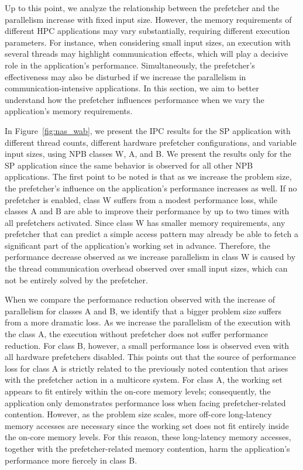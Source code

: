 \documentclass[AMA,final,STIX1COL]{WileyNJD-v2}
\newcommand{\fbm}[1]{\textcolor{red}{\bfseries \ul{fbm: #1} }\vspace{0.2cm}}
\begin{document}
Up to this point, we analyze the relationship between the prefetcher and the parallelism increase with fixed input size.
However, the memory requirements of different HPC applications may vary substantially, requiring different execution parameters. 
For instance, when considering small input sizes, an execution with several threads may highlight communication effects, which will play a decisive role in the application's performance.
Simultaneously, the prefetcher's effectiveness may also be disturbed if we increase the parallelism in communication-intensive applications.
In this section, we aim to better understand how the prefetcher influences performance when we vary the application's memory requirements. %

In Figure~\ref{fig:nas_wab}, we present the IPC results for the SP application with different thread counts, different hardware prefetcher configurations, and variable input sizes, using NPB classes W, A, and B.
We present the results only for the SP application since the same behavior is observed for all other NPB applications.
The first point to be noted is that as we increase the problem size, the prefetcher's influence on the application's performance increases as well. 
If no prefetcher is enabled, class W suffers from a modest performance loss, while classes A and B are able to improve their performance by up to two times with all prefetchers activated.
Since class W has smaller memory requirements, any prefetcher that can predict a simple access pattern may already be able to fetch a significant part of the application's working set in advance.
Therefore, the performance decrease observed as we increase parallelism in class W is caused by the thread communication overhead observed over small input sizes, which can not be entirely solved by the prefetcher.


When we compare the performance reduction observed with the increase of parallelism for classes A and B, we identify that a bigger problem size suffers from a more dramatic loss.
As we increase the parallelism of the execution with the class A, the execution without prefetcher does not suffer performance reduction.
For class B, however, a small performance loss is observed even with all hardware prefetchers disabled.
This points out that the source of performance loss for class A is strictly related to the previously noted contention that arises with the prefetcher action in a multicore system.
For class A, the working set appears to fit entirely within the on-core memory levels; consequently, the application only demonstrates performance loss when facing prefetcher-related contention.
However, as the problem size scales, more off-core long-latency memory accesses are necessary since the working set does not fit entirely inside the on-core memory levels.
For this reason, these long-latency memory accesses, together with the prefetcher-related memory contention, harm the application's performance more fiercely in class B.
\end{document}
